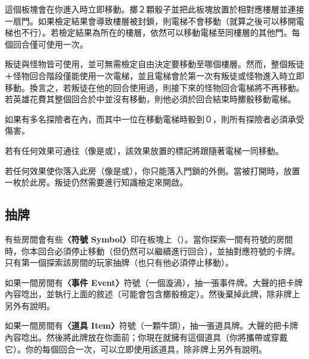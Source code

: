 \begin{RuleBox}{}
	這個板塊會在你進入時立即移動。擲２顆骰子並把此板塊放置於相對應樓層並連接一扇門。如果檢定結果會導致樓層被封鎖，則電梯不會移動（就算之後可以移開電梯也不行）。若檢定結果為所在的樓層，依然可以移動電梯至同樓層的其他門。每個回合僅可使用一次。

	叛徒與怪物皆可使用，並可無需檢定自由決定要移動至哪個樓層。然而，整個叛徒＋怪物回合階段僅能使用一次電梯，並且電梯會於第一次有叛徒或怪物進入時立即移動。換言之，若叛徒在他的回合使用過，則接下來的怪物回合電梯將不再移動。若英雄花費其整個回合於中並沒有移動，則他必須於回合結束時擲骰移動電梯。

	如果有多名探險者在內，而其中一位在移動電梯時骰到０，則所有探險者必須承受傷害。

	若有任何效果可通往（像是或），該效果放置的標記將跟隨著電梯一同移動。
\end{RuleBox}

\begin{RuleBox}{}
	若任何效果使你落入此房（像是或），你只能落入門鎖的外側。當被打開時，放置一枚於此房。叛徒仍然需要進行知識檢定來開啟。
\end{RuleBox}


\subsection{抽牌} \label{ssec:draw-event-item-and-omen-cards}

有些房間會有些\textbf{〈符號 Symbol〉}印在板塊上（\EventSymbol{}\ItemSymbol{}\OmenSymbol{}）。當你探索一間有符號的房間時，你本回合必須停止移動（但仍然可以繼續進行回合），並抽對應符號的卡牌。只有第一個探索該房間的玩家抽牌（也只有他必須停止移動）。

如果一間房間有\textbf{〈事件 Event〉}符號（一個漩渦\EventSymbol{}），抽一張事件牌。大聲的把卡牌內容唸出，並執行上面的敘述（可能會包含擲骰檢定）。然後棄掉此牌，除非牌上另外有說明。

如果一間房間有\textbf{〈道具 Item〉}符號（一顆牛頭\ItemSymbol{}），抽一張道具牌。大聲的把卡牌內容唸出。然後將此牌放在你面前；你現在就擁有這個道具（你將攜帶或穿戴它）。你的每個回合一次，可以立即使用該道具，除非牌上另外有說明。

